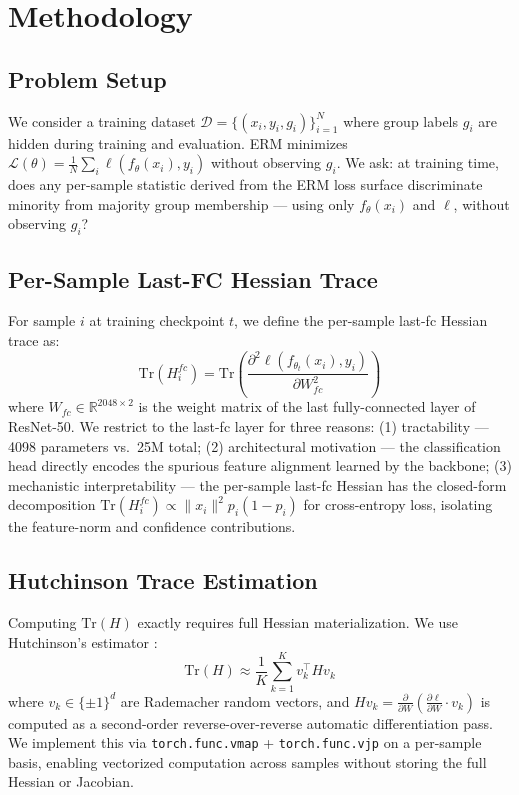 \section{Methodology}
\label{sec:method}

\subsection{Problem Setup}

We consider a training dataset $\mathcal{D} = \{(x_i, y_i, g_i)\}_{i=1}^N$ where group labels $g_i$ are hidden during training and evaluation. ERM minimizes $\mathcal{L}(\theta) = \frac{1}{N}\sum_i \ell(f_\theta(x_i), y_i)$ without observing $g_i$. We ask: at training time, does any per-sample statistic derived from the ERM loss surface discriminate minority from majority group membership --- using only $f_\theta(x_i)$ and $\ell$, without observing $g_i$?

\subsection{Per-Sample Last-FC Hessian Trace}

For sample $i$ at training checkpoint $t$, we define the per-sample last-fc Hessian trace as:
\begin{equation}
\text{Tr}(H_i^{fc}) = \text{Tr}\!\left(\frac{\partial^2 \ell(f_{\theta_t}(x_i), y_i)}{\partial W_{fc}^2}\right)
\end{equation}
where $W_{fc} \in \mathbb{R}^{2048\times 2}$ is the weight matrix of the last fully-connected layer of ResNet-50. We restrict to the last-fc layer for three reasons: (1) tractability --- 4098 parameters vs.\ 25M total; (2) architectural motivation --- the classification head directly encodes the spurious feature alignment learned by the backbone; (3) mechanistic interpretability --- the per-sample last-fc Hessian has the closed-form decomposition $\text{Tr}(H_i^{fc}) \propto \|x_i\|^2 p_i(1-p_i)$ for cross-entropy loss, isolating the feature-norm and confidence contributions.

\subsection{Hutchinson Trace Estimation}

Computing $\text{Tr}(H)$ exactly requires full Hessian materialization. We use Hutchinson's estimator \cite{avron2011randomized}:
\begin{equation}
\text{Tr}(H) \approx \frac{1}{K} \sum_{k=1}^K v_k^\top H v_k
\end{equation}
where $v_k \in \{{\pm}1\}^d$ are Rademacher random vectors, and $Hv_k = \frac{\partial}{\partial W}\!\left(\frac{\partial \ell}{\partial W} \cdot v_k\right)$ is computed as a second-order reverse-over-reverse automatic differentiation pass. We implement this via \texttt{torch.func.vmap} + \texttt{torch.func.vjp} on a per-sample basis, enabling vectorized computation across samples without storing the full Hessian or Jacobian.

